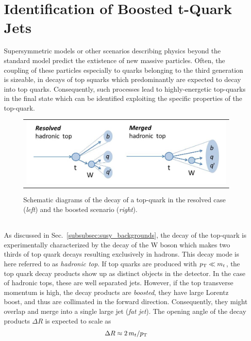 \section{Identification of Boosted t-Quark Jets }
\label{sec:boosted_tops}
Supersymmetric models or other scenarios describing physics beyond the standard model predict the extistence of new massive particles. Often, the coupling of these particles especially to quarks belonging to the third generation is sizeable, \eg in decays of top squarks which predominantly are expected to decay into top quarks. Consequently, such processes lead to highly-energetic top-quarks in the final state which can be identified exploiting the specific properties of the top-quark. 
\begin{figure}[!tp]
  \centering 
  \begin{tabular}{c}
    \includegraphics[width=1.0\textwidth]{figures/BoostedTops.jpg} 
  \end{tabular}
  \caption{Schematic diagrams of the decay of a top-quark in the resolved case (\textit{left}) and the boosted scenario (\textit{right}).}
  \label{fig:boosted_top}
\end{figure}
\\
As discussed in Sec.~\ref{subsubsec:susy_backgrounds}, the decay of the top-quark is experimentally characterized by the decay of the W boson which makes two thirds of top quark decays resulting exclusively in hadrons. This decay mode is here referred to as \textit{hadronic top}. If top quarks are produced with $p_{\text{T}} \ll m_t$, the top quark decay products show up as distinct objects in the detector. In the case of hadronic tops, these are well separated jets. However, if the top transverse momentum is high, the decay products are \textit{boosted}, \ie they have large Lorentz boost, and thus are collimated in the forward direction. Consequently, they might overlap and merge into a single large jet (\textit{fat jet}). The opening angle of the decay products $\Delta R$ is expected to scale as
\begin{equation}
 \Delta R \approx 2\,m_{t} /p_{\text{T}}
 \label{eq:rule-of-thumb}
\end{equation}  
